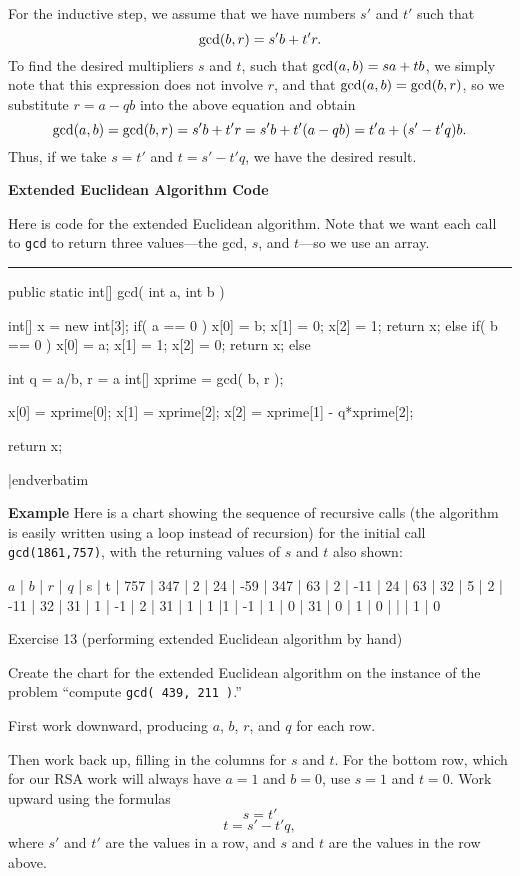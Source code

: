 For the inductive step, we assume that we have numbers $s'$ and $t'$ such that
$$
\hbox{gcd}(b,r) = s' b + t' r.
$$
To find the desired multipliers $s$ and $t$, such that $ \hbox{gcd}(a,b) = sa + tb$,
we simply note that this expression does not involve $r$, and that $\hbox{gcd}(a,b) =
\hbox{gcd}(b,r)$, so we substitute $r = a-qb$ into the above equation and obtain
$$
\hbox{gcd}(a,b) = \hbox{gcd}(b,r) = s' b + t' r = s' b + t'(a-qb) = t' a + (s' - t'q) b.
$$
Thus, if we take $s=t'$ and $t=s'-t'q$, we have the desired result.
\bigskip
\Out

{\bf Extended Euclidean Algorithm Code}
\medskip

Here is code for the extended Euclidean algorithm.  Note that we want each call to
{\tt gcd} to return three values---the gcd, $s$, and $t$---so we use an array.
\medskip
\hrule
\smallskip
\verbatim
public static int[] gcd( int a, int b )
{
  int[] x = new int[3];
  if( a == 0 )
  {
     x[0] = b;  x[1] = 0; x[2] = 1;
     return x;
  } 
  else if( b == 0 )
  {
    x[0] = a;  x[1] = 1;  x[2] = 0; 
    return x;
  }
  else
  {
    int q = a/b, r = a%
    int[] xprime = gcd( b, r );
    
    x[0] = xprime[0];  
    x[1] = xprime[2];  x[2] = xprime[1] - q*xprime[2];
    
    return x;
  }
}
|endverbatim
\border

\vfil\eject

{\bf Example}  Here is a chart showing the sequence of recursive calls (the algorithm is easily
written using a loop instead of recursion) for the initial call {\tt gcd(1861,757)}, with
the returning values of $s$ and $t$ also shown:
\medskip

$a$ | $b$ | $r$ | $q$  | s | t  | 757 | 347 | 2 | 24 | -59  | 347 | 63 | 2 | -11 | 24  | 63 | 32 | 5 | 2 | -11  | 32 | 31 | 1 | -1 | 2 | 31 | 1 | 1 |1 | -1 | 1 | 0  | 31 | 0 | 1 | 0 | |  | 1 | 0  
\endruledtable
\bigskip

{\bigboldfont Exercise 13} (performing extended Euclidean algorithm by hand)
\medskip

Create the chart for the extended Euclidean algorithm on the instance of the
problem ``compute {\tt gcd( 439, 211 )}.''  
\medskip

First work downward, producing $a$, $b$, $r$, and $q$ for each row.
\medskip

Then work back up, filling in the columns for $s$ and $t$.
For the bottom row, which for our RSA work will always have $a=1$ and $b=0$,
use $s=1$ and $t=0$.
Work upward using the
formulas 
$$
s = t'
$$
$$
t = s' - t'q,
$$
where $s'$ and $t'$ are the values in a row, and $s$ and $t$ are the values in the
row above.
\medskip

